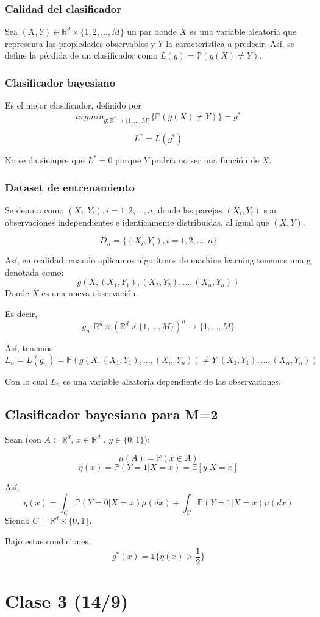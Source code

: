 \documentclass[12pt, a4paper]{article}
\begin{document}
\subsubsection{Calidad del clasificador}
Sea $(X,Y) \in \mathds{R}^d \times \{1,2, ..., M \}$ un par donde $X$ es una variable aleatoria que representa las propiedades observables y $Y$ la característica a predecir. Así, se define la pérdida de un clasificador como 
$L(g) = \mathds{P} ( g(X) \neq Y )$.
\subsubsection{Clasificador bayesiano}
Es el mejor clasificador, definido por
$$ argmin_{g:\mathds{R}^d \rightarrow \{1, ..., M\}}\{\mathds{P}( g(X) \neq Y )\} = g^{*}$$

$$L^{*}=L(g^{*})$$

No se da siempre que $L^{*}=0$ porque $Y$ podría no ser una función de $X$.

\subsubsection{Dataset de entrenamiento}
Se denota como $(X_i,Y_i), i = 1, 2, ..., n$; donde las parejas $(X_i,Y_i)$ son observaciones independientes e identicamente distribuidas, al igual que $(X,Y)$.

$$ D_n = \{(X_i,Y_i), i = 1, 2, ..., n\} $$

Así, en realidad, cuando aplicamos algoritmos de machine learning tenemos una g denotada como:
$$g(X,(X_1,Y_1), (X_2,Y_2), ..., (X_n,Y_n))$$
Donde $X$ es una nueva observación.

Es decir,
$$g_n:\mathds{R}^d \times ( \mathds{R}^d \times \{ 1, ..., M \})^n \rightarrow \{1,...,M\}$$

Así, tenemos $$L_n=L(g_n) = \mathds{P} ( g(X,(X_1,Y_1), ..., (X_n,Y_n)) \neq Y | (X_1,Y_1), ..., (X_n,Y_n))$$

Con lo cual $L_n$ es una variable aleatoria dependiente de las observaciones.
\subsection{Clasificador bayesiano para M=2}

Sean (con $A \subset \mathds{R}^d$, $x \in \mathds{R}^d$ , $y\in \{0,1\}$):

$$\mu(A)=\mathds{P}(x \in A)$$
$$\eta(x)=\mathds{P}(Y=1 | X=x)=\mathds{E}[y|X=x]$$

Así, $$\eta(x)=\int_{C}\mathds{P}(Y=0|X=x) \mu(dx) + \int_{C}\mathds{P}(Y=1|X=x) \mu(dx)$$
Siendo $C=\mathds{R}^d \times \{0,1\}$.

Bajo estas condiciones, $$g^{*}(x)=\mathds{1}\{ \eta(x)>\frac{1}{2} \}$$

\section{Clase 3 (14/9)}
\end{document}
